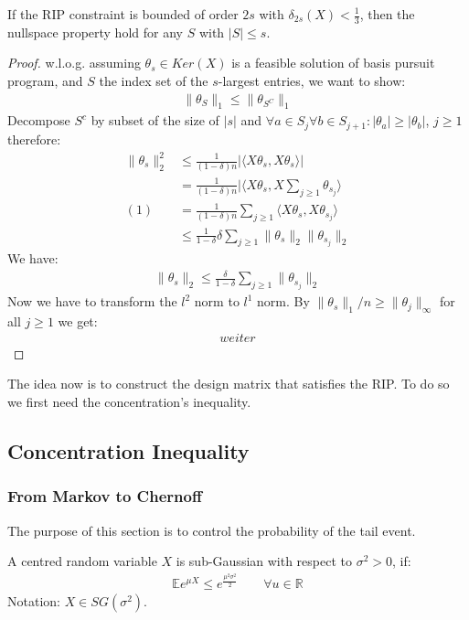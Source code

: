 \begin{proposition}
	If the RIP constraint is bounded of order $2s$ with $\delta_{2s}(X) < \frac{1}{3}$, then the nullspace property hold for any $S$ with $|S| \leq s$.
\end{proposition}
\begin{proof}
	w.l.o.g. assuming $\theta_s\in Ker(X)$ is a feasible solution of basis pursuit program, and $S$ the index set of the $s$-largest entries, we want to show:
	\begin{align*}
		\|\theta_{S}\|_1 \leq  \|\theta_{S^C}\|_1 
	\end{align*} 
	Decompose $S^c$ by subset of the size of $|s|$ and $\forall a \in S_j \forall b \in S_{j+1}: |\theta_a| \geq |\theta_b|$, $j \geq 1$ therefore:
	\begin{align*}
		\|\theta_s\|_2 ^2 &\leq \frac{1}{(1-\delta)n} |\langle X\theta_s, X\theta_s\rangle|\\
		&= \frac{1}{(1-\delta)n} |\langle X \theta_s , X \sum_{j \geq 1} \theta_{s_j} \rangle\\
	(1)	&=  \frac{1}{(1-\delta)n} \sum_{j \geq1} \langle X \theta_s, X \theta_{s_j}\rangle\\
		&\leq \frac{1}{1 - \delta} \delta \sum_{j \geq 1} \|\theta_s\|_2 \| \theta_{s_j}\|_2 
	\end{align*}
	We have:
	\begin{align*}
		\|\theta_s\|_2 \leq \frac{\delta}{1 - \delta}\sum_{j \geq 1} \|\theta_{s_j}\|_2
	\end{align*}
	Now we have to transform the $l^2$ norm to $l^1$ norm. By $\|\theta_s\|_1 \slash n \geq \|\theta_j\|_\infty$ for all $j \geq 1$ we get:
	\begin{align*}
		weiter
	\end{align*}
\end{proof}
The idea now is to construct the design matrix that satisfies the RIP. To do so we first need the concentration's inequality.

\subsection{Concentration Inequality}
\subsubsection*{From Markov to Chernoff}
The purpose of this section is to control the probability of the tail event. 
\begin{definition}
	A centred random variable $X$ is sub-Gaussian with respect to $\sigma^2 > 0$, if:
	\begin{align*}
		\mathbb{E} e^{\mu X} \le e^{\frac{\mu^2 \sigma^2}{2} } \qquad \forall u \in \mathbb{R}
	\end{align*}
	Notation: $X \in SG(\sigma^2)$.
\end{definition}
\begin{remark}
	
\end{remark}

